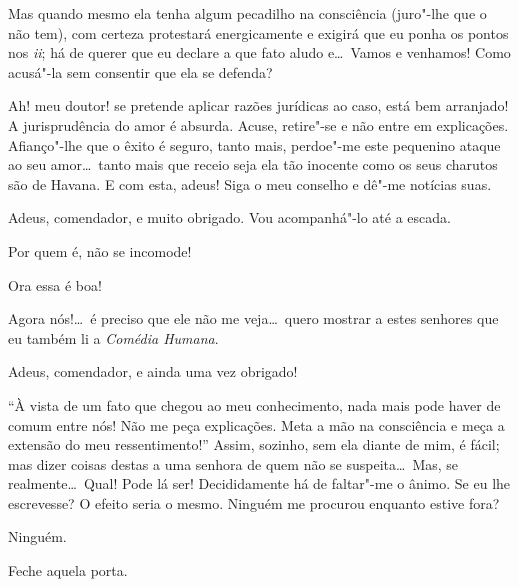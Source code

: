   Mas quando mesmo ela tenha algum pecadilho na
consciência (juro"-lhe que o não tem), com certeza protestará
energicamente e exigirá que eu ponha os pontos nos \textit{ii}; há de
querer que eu declare a que fato aludo e\ldots\ Vamos e venhamos! Como
acusá"-la sem consentir que ela se defenda?

 Ah! meu doutor! se pretende aplicar razões
jurídicas ao caso, está bem arranjado! A jurisprudência do amor é
absurda. Acuse, retire"-se e não entre em explicações. Afianço"-lhe que o
êxito é seguro, tanto mais, perdoe"-me este pequenino ataque ao seu
amor\ldots\  tanto mais que receio seja ela tão inocente como os seus
charutos são de Havana.  E com esta, adeus! Siga o meu conselho e dê"-me
notícias suas. 

   Adeus, comendador,
e muito obrigado. Vou acompanhá"-lo até a escada.

  Por quem é, não se incomode!

  Ora essa é boa! 

  
Agora nós!\ldots\ é preciso que ele não me veja\ldots\ quero mostrar a estes
senhores que eu também li a \textit{Comédia Humana}. 

  Adeus,
comendador, e ainda uma vez obrigado! 


  ``À vista de um fato que chegou
ao meu conhecimento, nada mais pode haver de comum entre nós! Não me
peça explicações. Meta a mão na consciência e meça a extensão do meu
ressentimento!'' Assim, sozinho, sem ela diante de mim, é
fácil; mas dizer coisas destas a uma senhora de quem não se suspeita\ldots\ 
Mas, se realmente\ldots\ Qual! Pode lá ser! Decididamente há de faltar"-me o
ânimo. \paren{Com uma ideia.} Se eu lhe escrevesse? O
efeito seria o mesmo.  Ninguém me procurou enquanto estive fora?

  Ninguém.

  Feche aquela porta. 

